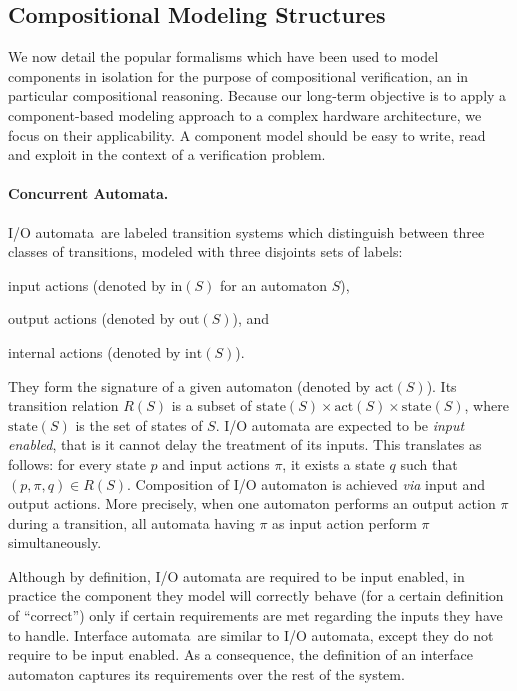 \subsection{Compositional Modeling Structures}
\label{subsec:sota:compmod}

We now detail the popular formalisms which have been used to model components in
isolation for the purpose of compositional verification, an in particular
compositional reasoning.
%
Because our long-term objective is to apply a component-based modeling approach
to a complex hardware architecture, we focus on their applicability.
%
A component model should be easy to write, read and exploit in the context of a
verification problem.

\paragraph{Concurrent Automata.}
%
I/O automata\,\cite{lynch1988ioautomata} are labeled transition systems which
distinguish between three classes of transitions, modeled with three disjoints
sets of labels:
%
\begin{inparaenum}[(1)]
\item input actions (denoted by \( \mathrm{in}(S) \) for an automaton \( S \)),
\item output actions (denoted by \( \mathrm{out}(S) \)), and
\item internal actions (denoted by \( \mathrm{int}(S) \)).
\end{inparaenum}
%
They form the signature of a given automaton (denoted by \( \mathrm{act}(S) \)).
%
Its transition relation \( R(S) \) is a subset of
\( \mathrm{state}(S) \times \mathrm{act}(S) \times \mathrm{state}(S) \), where
\( \mathrm{state}(S) \) is the set of states of \( S \).
%
I/O automata are expected to be \emph{input enabled}, that is it cannot delay
the treatment of its inputs.
%
This translates as follows: for every state \( p \) and input actions \( \pi \),
it exists a state \( q \) such that \( (p, \pi, q) \in R(S) \).
%
Composition of I/O automaton is achieved \emph{via} input and output actions.
%
More precisely, when one automaton performs an output action \( \pi \) during a
transition, all automata having \( \pi \) as input action perform \( \pi \)
simultaneously.

Although by definition, I/O automata are required to be input enabled, in
practice the component they model will correctly behave (for a certain
definition of ``correct'') only if certain requirements are met regarding the
inputs they have to handle.
%
Interface automata\,\cite{de2001interfaceautomata} are similar to I/O automata,
except they do not require to be input enabled.
%
As a consequence, the definition of an interface automaton captures its
requirements over the rest of the system.

